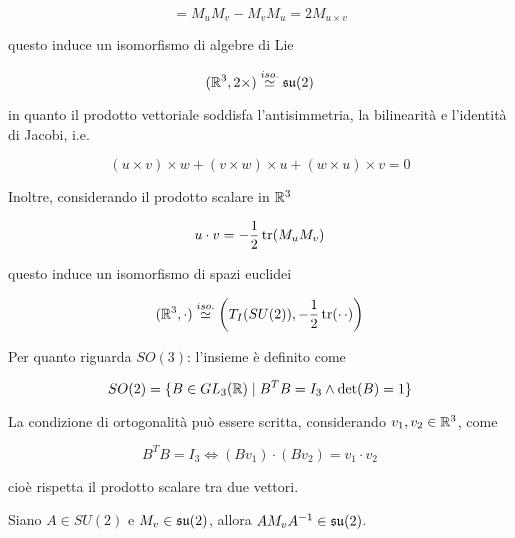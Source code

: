 \begin{equation}
	[M_{u},M_{v}] = M_{u} M_{v} - M_{v} M_{u} = 2 M_{u \times v}
\end{equation}

questo induce un isomorfismo di algebre di Lie

\begin{equation}
	(\mathbb{R}^{3}, 2 \times) \stackrel{iso.}{\simeq} \mathfrak{su}(2)
\end{equation}

in quanto il prodotto vettoriale soddisfa l'antisimmetria, la bilinearità e l'identità di Jacobi, i.e.

\begin{equation}
	(u \times v) \times w + (v \times w) \times u + (w \times u) \times v = 0
\end{equation}

Inoltre, considerando il prodotto scalare in $ \mathbb{R}^{3} $

\begin{equation}
	u \cdot v = - \dfrac{1}{2} \tr(M_{u} M_{v})
\end{equation}

questo induce un isomorfismo di spazi euclidei

\begin{equation}
	(\mathbb{R}^{3},\cdot) \stackrel{iso.}{\simeq} \left( T_{I}(SU(2)), -\dfrac{1}{2} \tr(\cdot \, \cdot) \right)
\end{equation}

Per quanto riguarda $ SO(3) $: l'insieme è definito come

\begin{equation}
	SO(2) = \{ B \in GL_{3}(\mathbb{R}) \mid B^{T} B = I_{3} \wedge \det(B) = 1 \}
\end{equation}

La condizione di ortogonalità può essere scritta, considerando $ v_{1},v_{2} \in \mathbb{R}^{3} $, come

\begin{equation}
	B^{T} B = I_{3} \iff (B v_{1}) \cdot (B v_{2}) = v_{1} \cdot v_{2}
\end{equation}

cioè rispetta il prodotto scalare tra due vettori.

\begin{lemma}
	Siano $ A \in SU(2) $ e $ M_{v} \in \mathfrak{su}(2) $, allora $ A M_{v} A^{-1} \in \mathfrak{su}(2) $.
\end{lemma}

